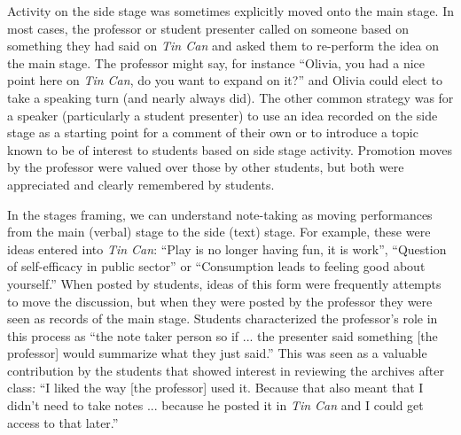 Activity on the side stage was sometimes explicitly moved onto the main stage. In most cases, the professor or student presenter called on someone based on something they had said on \emph{Tin Can} and asked them to re-perform the idea on the main stage. The professor might say, for instance ``Olivia, you had a nice point here on \emph{Tin Can}, do you want to expand on it?'' and Olivia could elect to take a speaking turn (and nearly always did). The other common strategy was for a speaker (particularly a student presenter) to use an idea recorded on the side stage as a starting point for a comment of their own or to introduce a topic known to be of interest to students based on side stage activity. Promotion moves by the professor were valued over those by other students, but both were appreciated and clearly remembered by students. 


In the stages framing, we can understand note-taking as moving performances from the main (verbal) stage to the side (text) stage. For example, these were ideas entered into \emph{Tin Can}: ``Play is no longer having fun, it is work'', ``Question of self-efficacy in public sector'' or ``Consumption leads to feeling good about yourself.'' When posted by students, ideas of this form were frequently attempts to move the discussion, but when they were posted by the professor they were seen as records of the main stage. Students characterized the professor's role in this process as ``the note taker person so if ... the presenter said something [the professor] would summarize what they just said.'' This was seen as a valuable contribution by the students that showed interest in reviewing the archives after class: ``I liked the way [the professor] used it. Because that also meant that I didn't need to take notes ... because he posted it in \emph{Tin Can} and I could get access to that later.''



